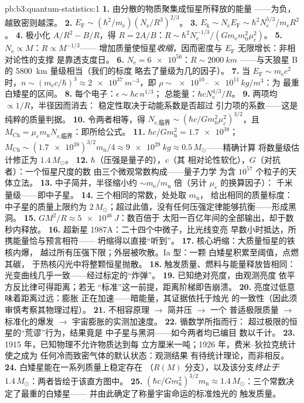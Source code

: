 \begin{solution}{pb:b3:quantum-statistics:1}
\textbf{1.} 由分散的物质聚集成恒星所释放的能量
——为负，越致密则越深。
\textbf{2.} $E_{\text{F}} \sim (\hbar^2/m_{\text{e}})
(N_{\text{e}}/R^3)^{2/3}$。
\textbf{3.} $E_{\text{k}} \sim N_{\text{e}}E_{\text{F}} \sim
\hbar^2N_{\text{e}}^{5/3}/m_{\text{e}}R^2$。
\textbf{4.} 极小化 $A/R^2 - B/R$，得 $R = 2A/B$：$R \sim
\hbar^2N_{\text{e}}^{-1/3}/(Gm_{\text{e}}m_{\text{n}}^2\mu_e^2)$。
\textbf{5.} $N_{\text{e}} \propto M$：$R \propto M^{-1/3}$——
增加质量使恒星\emph{收缩}，因而密度与 $E_{\text{F}}$
无限增长：非相对论性的支撑
是靠透支度日。
\textbf{6.} $N_{\text{e}} = \num{6e56}$：$R \sim \qty{2000}{km}$
——与天狼星 B 的 \qty{5800}{km} 量级相当（我们的标度
略去了量级为几的因子）。
\textbf{7.} 当 $E_{\text{F}} \sim m_{\text{e}}c^2$ 时，$n \sim
(m_{\text{e}}c/\hbar)^3 \approx \qty{2e37}{m^{-3}}$，即 $\rho
\sim \num{e10}$--$\num{e11}\,\unit{kg/m^3}$：为
最重白矮星的区间。
\textbf{8.} 每个电子：$\epsilon \sim \hbar c\,n^{1/3}$；
总能量：$\hbar cN_{\text{e}}^{4/3}/R$。
\textbf{9.} 两项均 $\propto 1/R$，半径因而消去：
稳定性取决于动能系数是否超过
引力项的系数——这是纯粹的质量判据。
\textbf{10.} 令两者相等，得 $N_{\text{e,临界}} \sim (\hbar c/
Gm_{\text{n}}^2\mu_e^2)^{3/2}$，且 $M_{\text{Ch}} =
\mu_em_{\text{n}}N_{\text{e,临界}}$：即所给公式。
\textbf{11.} $\hbar c/Gm_{\text{n}}^2 = \num{1.7e38}$；
$M_{\text{Ch}} \sim (\num{1.7e38})^{3/2}m_{\text{n}}/4 \approx
\qty{9e29}{kg} \approx 0.5\,M_\odot$——精确计算
将数量级估计修正为 $1.4\,M_\odot$。
\textbf{12.} $\hbar$（压强是量子的），$c$（其
相对论性软化），$G$（对抗者）：一个恒星尺度的数
由三个微观常数构成——量子力学
为含 $10^{57}$ 个粒子的天体立法。
\textbf{13.} 中子简并，半径缩小约
$\sim m_{\text{e}}/m_{\text{n}}$ 倍（另计 $\mu_e$ 的换算因子）：
千米量级——即中子星。
\textbf{14.} 三个相同的常数，处处取 $m_{\text{n}}$，
给出相同的质量标度：中子星的质量上限约为
$2\,M_\odot$；超过此值，没有任何压强定律能够抗衡——形成黑洞。
\textbf{15.} $GM^2/R \approx \qty{5e46}{J}$：数百倍于
太阳一百亿年间的全部输出，却于数秒内释放。
\textbf{16.} 超新星 1987A：二十四个中微子，比光线变亮
早数小时抵达，所携能量恰与预言相符——
坍缩得以直接“听到”。
\textbf{17.} 核心坍缩：大质量恒星的铁核内爆，
越过所有压强下限；外层被吹散。Ia 型：一颗
白矮星积累至阈值，点燃其碳，
于热核闪光中将整颗恒星抛散。
\textbf{18.} 触发质量、燃料与能量释放皆相同：
光变曲线几乎一致——经过标定的“炸弹”。
\textbf{19.} 已知绝对亮度，由观测亮度
依平方反比律可得距离；若无
“标准”这一前提，距离阶梯即告崩溃。
\textbf{20.} 亮度过低意味着距离过远：膨胀
正在加速——暗能量，其证据依托于烛光
的一致性（因此须审慎考察其物理过程）。
\textbf{21.} 不相容原理 $\to$ 简并压 $\to$ 一个
普适极限质量 $\to$ 标准化的爆发 $\to$
宇宙膨胀的实测加速度。
\textbf{22.} 循数学所指而行：
超过极限的恒星的“荒谬”行为，结果竟是
中子星与黑洞——如今两者均已编目
数以千计。
\textbf{23.} 1915 年，已知物理不允许物质达到每
立方厘米一吨；1926 年，费米–狄拉克统计使之成为
任何冷而致密气体的默认状态：观测结果
有待统计理论，而非相反。
\textbf{24.} 白矮星能在一系列质量上稳定存在
（$R(M)$ 分支），以及该分支\emph{终止于}
$1.4\,M_\odot$：两者皆绘于该直方图中。
\textbf{25.} $(\hbar c/Gm_{\text{n}}^2)^{3/2}m_{\text{n}} \approx
1.4\,M_\odot$：三个常数决定了最重的白矮星——
并由此确定了称量宇宙命运的标准烛光的
触发质量。
\end{solution}
